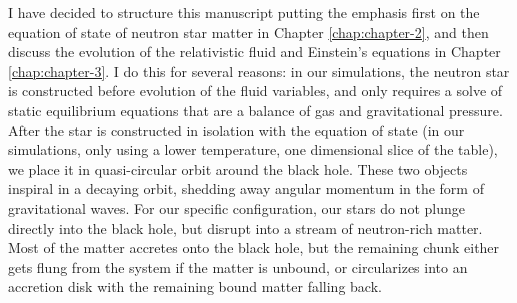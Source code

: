 I have decided to structure this manuscript putting the emphasis first on the equation of state of neutron star matter in Chapter \ref{chap:chapter-2}, and then discuss the evolution of the relativistic fluid and Einstein's equations in Chapter \ref{chap:chapter-3}.  
I do this for several reasons: in our simulations, the neutron star is constructed before evolution of the fluid variables, and only requires a solve of static equilibrium equations that are a balance of gas and gravitational pressure.  After the star is constructed in isolation with the equation of state (in our simulations, only using a lower temperature, one dimensional slice of the table), we place it in quasi-circular orbit around the black hole.  
These two objects inspiral in a decaying orbit, shedding away angular momentum in the form of gravitational waves.  
For our specific configuration, our stars do not plunge directly into the black hole, but disrupt into a stream of neutron-rich matter. 
Most of the matter accretes onto the black hole, but the remaining chunk either gets flung from the system if the matter is unbound, or circularizes into an accretion disk with the remaining bound matter falling back.